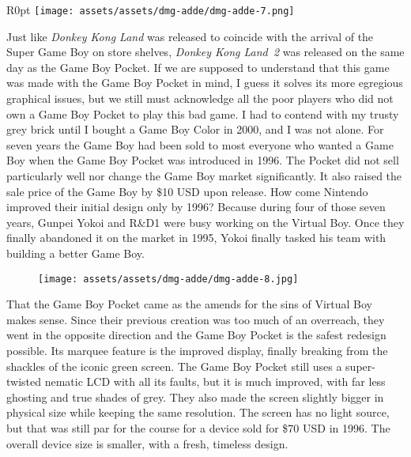 \documentclass{book}
\begin{document}
\begin{wrapfigure}{R}{0pt} \texttt{[image: assets/assets/dmg-adde/dmg-adde-7.png]}\end{wrapfigure}
Just like \emph{Donkey Kong Land} was released to coincide with the arrival of the Super Game Boy on store shelves, \emph{Donkey Kong Land 2} was released on the same day as the Game Boy Pocket. If we are supposed to understand that this game was made with the Game Boy Pocket in mind, I guess it solves its more egregious graphical issues, but we still must acknowledge all the poor players who did not own a Game Boy Pocket to play this bad game. I had to contend with my trusty grey brick until I bought a Game Boy Color in 2000, and I was not alone. For seven years the Game Boy had been sold to most everyone who wanted a Game Boy when the Game Boy Pocket was introduced in 1996. The Pocket did not sell particularly well nor change the Game Boy market significantly. It also raised the sale price of the Game Boy by \$10 USD upon release. How come Nintendo improved their initial design only by 1996? Because during four of those seven years, Gunpei Yokoi and R\&D1 were busy working on the Virtual Boy. Once they finally abandoned it on the market in 1995, Yokoi finally tasked his team with building a better Game Boy.

\begin{figure}[hbt]
\vskip 10pt
\centering \texttt{[image: assets/assets/dmg-adde/dmg-adde-8.jpg]}
\vskip 6pt
\end{figure}
That the Game Boy Pocket came as the amends for the sins of Virtual Boy makes sense. Since their previous creation was too much of an overreach, they went in the opposite direction and the Game Boy Pocket is the safest redesign possible. Its marquee feature is the improved display, finally breaking from the shackles of the iconic green screen. The Game Boy Pocket still uses a super-twisted nematic LCD with all its faults, but it is much improved, with far less ghosting and true shades of grey. They also made the screen slightly bigger in physical size while keeping the same resolution. The screen has no light source, but that was still par for the course for a device sold for \$70 USD in 1996. The overall device size is smaller, with a fresh, timeless design.
\end{document}
